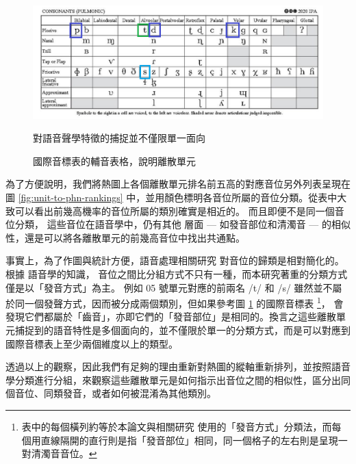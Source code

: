 \begin{figure}
    \centering
    \includegraphics[width=1\linewidth]{figures/ipa_similarity.png}
    \caption[]{
國際音標表的輔音表格，說明離散單元}
                                                                對語音聲學特徵的捕捉並不僅限單一面向
    \label{fig:ipa-cons-table-sim}
\end{figure}

        為了方便說明，我們將熱圖上各個離散單元排名前五高的對應音位另外列表呈現在圖 \ref{fig:unit-to-phn-rankings} 中，並用顏色標明各音位所屬的音位分類。從表中大致可以看出前幾高機率的音位所屬的類別確實是相近的。
而且即便不是同一個音位分類，
這些音位在語音學中，仍有其他
層面 --- 如發音部位和清濁音 --- 
的相似性，還是可以將各離散單元的前幾高音位中找出共通點。

事實上，為了作圖與統計方便，語音處理相關研究 \cite{10097097, abdullah23_interspeech} 
對音位的歸類是相對簡化的。根據
語音學的知識，
音位之間比分組方式不只有一種，而本研究著重的分類方式僅是以「發音方式」為主。
例如 05 號單元對應的前兩名 /t/ 和 /s/ 雖然並不屬於同一個發聲方式，因而被分成兩個類別，但如果參考圖 \ref{fig:ipa-cons-table-sim} 的國際音標表 \footnote{表中的每個橫列約等於本論文與相關研究\cite{10097097, abdullah23_interspeech} 使用的「發音方式」分類法，而每個用直線隔開的直行則是指「發音部位」相同，同一個格子的左右則是呈現一對清濁音音位。}，
會發現它們都屬於「齒音」，亦即它們的「發音部位」是相同的。換言之這些離散單元捕捉到的語音特性是多個面向的，並不僅限於單一的分類方式，而是可以對應到國際音標表上至少兩個維度以上的類型。



        透過以上的觀察，因此我們有足夠的理由重新對熱圖的縱軸重新排列，並按照語音學分類進行分組，來觀察這些離散單元是如何指示出音位之間的相似性，區分出同個音位、同類發音，或者如何被混淆為其他類別。  %

